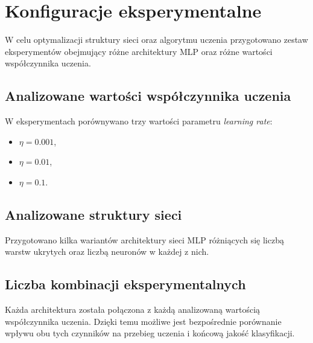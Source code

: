 \section{Konfiguracje eksperymentalne}

W celu optymalizacji struktury sieci oraz algorytmu uczenia przygotowano
zestaw eksperymentów obejmujący różne architektury MLP oraz różne wartości
współczynnika uczenia.

\subsection{Analizowane wartości współczynnika uczenia}

W eksperymentach porównywano trzy wartości parametru \textit{learning rate}:
\begin{itemize}
    \item \(\eta = 0.001\),
    \item \(\eta = 0.01\),
    \item \(\eta = 0.1\).
\end{itemize}

\subsection{Analizowane struktury sieci}

Przygotowano kilka wariantów architektury sieci MLP różniących się liczbą
warstw ukrytych oraz liczbą neuronów w każdej z nich.

\begin{table}[H]
    \centering
    
    \caption{Konfiguracje architektur analizowane w etapie trzecim}
    \label{tab:network_configurations}
\end{table}

\subsection{Liczba kombinacji eksperymentalnych}

Każda architektura została połączona z każdą analizowaną wartością
współczynnika uczenia. Dzięki temu możliwe jest bezpośrednie porównanie
wpływu obu tych czynników na przebieg uczenia i końcową jakość klasyfikacji.
